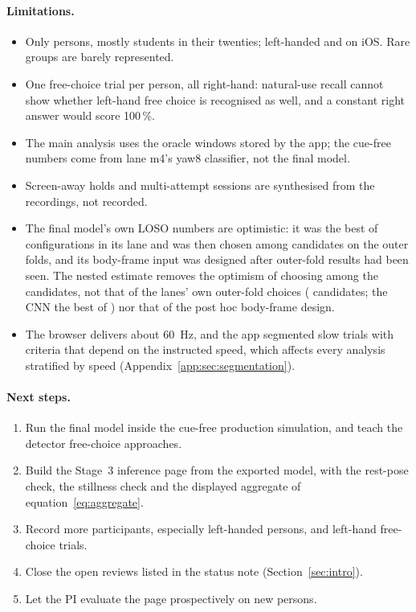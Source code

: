 \paragraph{Limitations.}
\begin{itemize}[nosep,leftmargin=1.5em]
  \item Only  persons, mostly students in their twenties;  left-handed and
     on iOS. Rare groups are barely represented.
  \item One free-choice trial per person, all right-hand: natural-use recall cannot show whether left-hand free
    choice is recognised as well, and a constant right answer would score 100\,\%.
  \item The main analysis uses the oracle windows stored by the app; the cue-free numbers come from lane m4's yaw8
    classifier, not the final model.
  \item Screen-away holds and multi-attempt sessions are synthesised from the recordings, not recorded.
  \item The final model's own LOSO numbers are optimistic: it was the best of 
    configurations in its lane and was then chosen among  candidates on the outer folds, and
    its body-frame input was designed after outer-fold results had been seen. The nested estimate removes the
    optimism of choosing among the  candidates, not that of the lanes' own outer-fold choices
    ( candidates; the CNN the best of ) nor that of the
    post hoc body-frame design.
  \item The browser delivers about 60~Hz, and the app segmented slow trials with criteria that depend on the
    instructed speed, which affects every analysis stratified by speed (Appendix~\ref{app:sec:segmentation}).
\end{itemize}

\paragraph{Next steps.}
\begin{enumerate}[nosep,leftmargin=1.5em]
  \item Run the final model inside the cue-free production simulation, and teach the detector free-choice approaches.
  \item Build the Stage~3 inference page from the exported model, with the rest-pose check, the stillness check and
    the displayed aggregate of equation~\eqref{eq:aggregate}.
  \item Record more participants, especially left-handed persons, and left-hand free-choice trials.
  \item Close the open reviews listed in the status note (Section~\ref{sec:intro}).
  \item Let the PI evaluate the page prospectively on new persons.
\end{enumerate}
